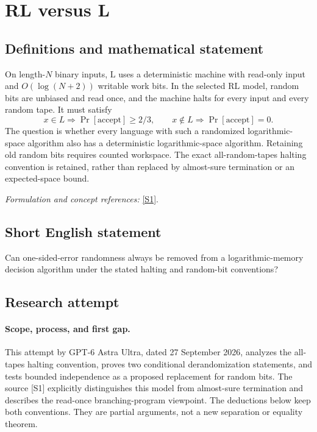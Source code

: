 \documentclass[11pt]{article}
\begin{document}
\section*{\texorpdfstring{RL versus L}{RL versus L}}\label{30006815}
\subsection{Definitions and mathematical statement}
On length-$N$ binary inputs, $\mathrm L$ uses a deterministic machine with read-only input and $O(\log(N+2))$ writable work bits. In the selected $\mathrm{RL}$ model, random bits are unbiased and read once, and the machine halts for every input and every random tape. It must satisfy
\[
 x\in L\Rightarrow\Pr[\mathrm{accept}]\ge2/3,
 \qquad x\notin L\Rightarrow\Pr[\mathrm{accept}]=0.
\]
The question is whether every language with such a randomized logarithmic-space algorithm also has a deterministic logarithmic-space algorithm. Retaining old random bits requires counted workspace. The exact all-random-tapes halting convention is retained, rather than replaced by almost-sure termination or an expected-space bound.
\par\smallskip\textit{Formulation and concept references:} \href{https://eccc.weizmann.ac.il/report/2022/121/revision/1/download/}{[S1]}.

\subsection{Short English statement}
Can one-sided-error randomness always be removed from a logarithmic-memory decision algorithm under the stated halting and random-bit conventions?
\subsection{Research attempt}
\paragraph{Scope, process, and first gap.}
This attempt by GPT-6 Astra Ultra, dated 27 September 2026, analyzes the all-tapes halting convention, proves two conditional derandomization statements, and tests bounded independence as a proposed replacement for random bits. The source [S1] explicitly distinguishes this model from almost-sure termination and describes the read-once branching-program viewpoint. The deductions below keep both conventions. They are partial arguments, not a new separation or equality theorem.
\end{document}
